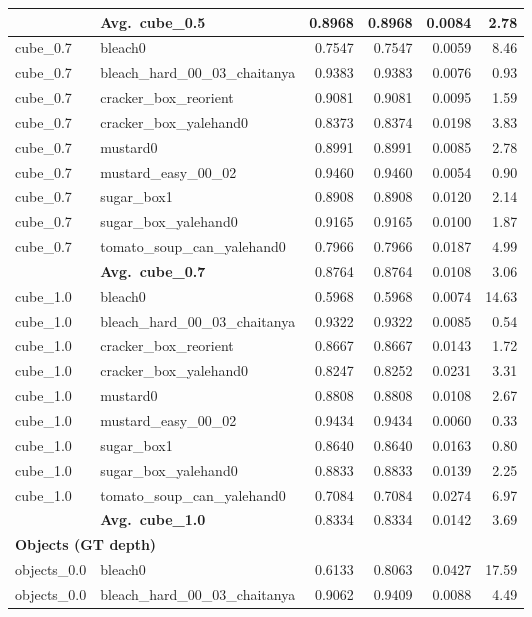 \begin{longtable}{llrrrr}
  & \textbf{Avg.~cube_0.5} & 0.8968 & 0.8968 & 0.0084 & 2.78 \\
  \midrule
  cube_0.7 & bleach0 & 0.7547 & 0.7547 & 0.0059 & 8.46 \\
  cube_0.7 & bleach\_hard\_00\_03\_chaitanya & 0.9383 & 0.9383 & 0.0076 & 0.93 \\
  cube_0.7 & cracker\_box\_reorient & 0.9081 & 0.9081 & 0.0095 & 1.59 \\
  cube_0.7 & cracker\_box\_yalehand0 & 0.8373 & 0.8374 & 0.0198 & 3.83 \\
  cube_0.7 & mustard0 & 0.8991 & 0.8991 & 0.0085 & 2.78 \\
  cube_0.7 & mustard\_easy\_00\_02 & 0.9460 & 0.9460 & 0.0054 & 0.90 \\
  cube_0.7 & sugar\_box1 & 0.8908 & 0.8908 & 0.0120 & 2.14 \\
  cube_0.7 & sugar\_box\_yalehand0 & 0.9165 & 0.9165 & 0.0100 & 1.87 \\
  cube_0.7 & tomato\_soup\_can\_yalehand0 & 0.7966 & 0.7966 & 0.0187 & 4.99 \\
  \cmidrule{2-6}
  & \textbf{Avg.~cube_0.7} & 0.8764 & 0.8764 & 0.0108 & 3.06 \\
  \midrule
  cube_1.0 & bleach0 & 0.5968 & 0.5968 & 0.0074 & 14.63 \\
  cube_1.0 & bleach\_hard\_00\_03\_chaitanya & 0.9322 & 0.9322 & 0.0085 & 0.54 \\
  cube_1.0 & cracker\_box\_reorient & 0.8667 & 0.8667 & 0.0143 & 1.72 \\
  cube_1.0 & cracker\_box\_yalehand0 & 0.8247 & 0.8252 & 0.0231 & 3.31 \\
  cube_1.0 & mustard0 & 0.8808 & 0.8808 & 0.0108 & 2.67 \\
  cube_1.0 & mustard\_easy\_00\_02 & 0.9434 & 0.9434 & 0.0060 & 0.33 \\
  cube_1.0 & sugar\_box1 & 0.8640 & 0.8640 & 0.0163 & 0.80 \\
  cube_1.0 & sugar\_box\_yalehand0 & 0.8833 & 0.8833 & 0.0139 & 2.25 \\
  cube_1.0 & tomato\_soup\_can\_yalehand0 & 0.7084 & 0.7084 & 0.0274 & 6.97 \\
  \cmidrule{2-6}
  & \textbf{Avg.~cube_1.0} & 0.8334 & 0.8334 & 0.0142 & 3.69 \\
  \midrule
\multicolumn{6}{l}{\textbf{Objects (GT depth)}} \\
\midrule
  objects_0.0 & bleach0 & 0.6133 & 0.8063 & 0.0427 & 17.59 \\
  objects_0.0 & bleach\_hard\_00\_03\_chaitanya & 0.9062 & 0.9409 & 0.0088 & 4.49 \\

\end{longtable}

